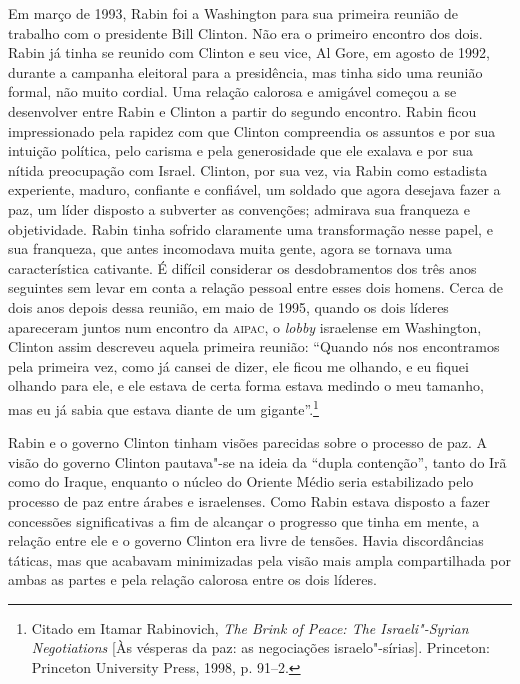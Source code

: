Em março de 1993, Rabin foi a Washington para sua primeira reunião de
trabalho com o presidente Bill Clinton. Não era o primeiro encontro dos
dois. Rabin já tinha se reunido com Clinton e seu vice, Al Gore, em
agosto de 1992, durante a campanha eleitoral para a presidência, mas
tinha sido uma reunião formal, não muito cordial. Uma relação calorosa e
amigável começou a se desenvolver entre Rabin e Clinton a partir do
segundo encontro. Rabin ficou impressionado pela rapidez com que Clinton
compreendia os assuntos e por sua intuição política, pelo carisma e pela
generosidade que ele exalava e por sua nítida preocupação com Israel.
Clinton, por sua vez, via Rabin como estadista experiente, maduro,
confiante e confiável, um soldado que agora desejava fazer a paz, um
líder disposto a subverter as convenções; admirava sua franqueza e
objetividade. Rabin tinha sofrido claramente uma transformação nesse
papel, e sua franqueza, que antes incomodava muita gente, agora se
tornava uma característica cativante. É difícil considerar os
desdobramentos dos três anos seguintes sem levar em conta a relação
pessoal entre esses dois homens. Cerca de dois anos depois dessa
reunião, em maio de 1995, quando os dois líderes apareceram juntos num
encontro da \textsc{aipac}, o \textit{lobby} israelense em Washington, Clinton assim
descreveu aquela primeira reunião: ``Quando nós nos encontramos pela
primeira vez, como já cansei de dizer, ele ficou me olhando, e eu fiquei
olhando para ele, e ele estava de certa forma estava medindo o meu
tamanho, mas eu já sabia que estava diante de um gigante''.\footnote{Citado
  em Itamar Rabinovich, \textit{The Brink of Peace: The Israeli"-Syrian
  Negotiations} {[}Às vésperas da paz: as negociações israelo"-sírias{]}. Princeton: Princeton University Press, 1998, p. 91--2.}

Rabin e o governo Clinton tinham visões parecidas sobre o processo de
paz. A visão do governo Clinton pautava"-se na ideia da ``dupla
contenção'', tanto do Irã como do Iraque, enquanto o núcleo do Oriente
Médio seria estabilizado pelo processo de paz entre árabes e
israelenses. Como Rabin estava disposto a fazer concessões
significativas a fim de alcançar o progresso que tinha em mente, a
relação entre ele e o governo Clinton era livre de tensões. Havia
discordâncias táticas, mas que acabavam minimizadas pela visão mais
ampla compartilhada por ambas as partes e pela relação calorosa entre os
dois líderes.

